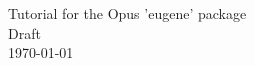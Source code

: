 \documentclass[fleqn]{howto}
\begin{document}
\begin{center}
{\Large Tutorial for the Opus 'eugene' package}\\[5mm]
{\large Draft}\\[2mm]
\today
\end{center}
\end{document}
